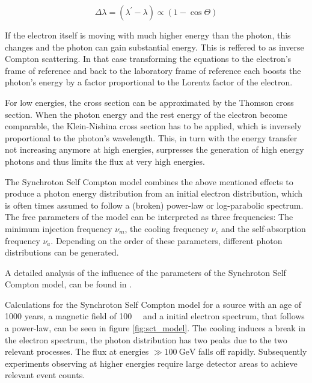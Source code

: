 \begin{equation}
	\Delta \lambda = (\lambda^{\prime} - \lambda)  \propto \left(1-\cos{\Theta} \right)
	\label{eq:compton}
\end{equation}

If the electron itself is moving with much higher energy
than the photon, this changes and the photon can gain substantial energy.
This is reffered to as inverse Compton scattering.
In that case transforming the equations to the 
electron's frame of reference and back to the laboratory frame of reference each
boosts the photon's energy by a factor proportional to 
the Lorentz factor of the electron.

For low energies, the cross section can be approximated by 
the Thomson cross section. 
When the photon energy and the rest energy of the electron
become comparable, the Klein-Nishina cross section has to be applied,
which is inversely proportional to the photon's
wavelength.
This, in turn with the energy transfer not increasing anymore at high energies,
surpresses the generation of high energy photons \cite{Nakar_2009} and
thus limits the flux at very high energies.

The Synchroton Self Compton model combines the above mentioned
effects to produce a photon energy distribution from an initial
electron distribution, which is often times assumed to
follow a (broken) power-law or log-parabolic spectrum.
The free parameters of the model can be interpreted as 
three frequencies: The minimum injection frequency $\nu_m$,
the cooling frequency $\nu_c$ and the self-absorption frequency $\nu_a$.
Depending on the order of these parameters, different
photon distributions can be generated.

A detailed analysis of the influence of the parameters of
the Synchroton Self Compton model, can be found in 
\cite{10.1093/mnras/stt1461}.

Calculations for the Synchroton Self Compton model for a source
with an age of 1000 years, a magnetic field of
\SI{100}{\micro\gauss} and a initial electron spectrum, that
follows a power-law, can be seen in figure \ref{fig:sct_model}.
The cooling induces a break in the electron spectrum,
the photon distribution has two peaks due to the
two relevant processes.
The flux at energies $\gg \SI{100}{\giga\electronvolt}$
falls off rapidly. Subsequently experiments
observing at higher energies require large detector areas
to achieve relevant event counts.

